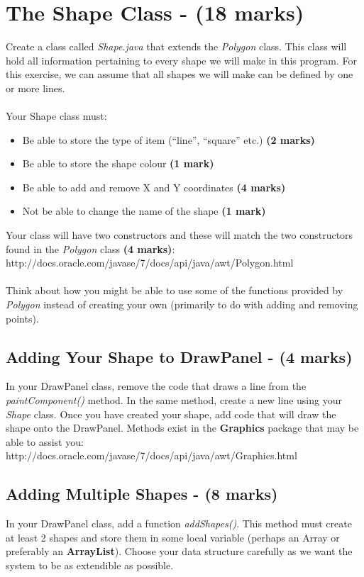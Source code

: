 \documentclass[a4paper,12pt]{article}
\begin{document}
\section{The Shape Class - (18 marks)}
Create a class called \textit{Shape.java} that extends the \textit{Polygon} class. This class will hold all information pertaining to every shape we will make in this program. For this exercise, we can assume that all shapes we will make can be defined by one or more lines.\\
\\
Your Shape class must:
\begin{itemize}
\item Be able to store the type of item (``line'', ``square'' etc.) {\bf (2 marks)}
\item Be able to store the shape colour {\bf (1 mark)}
\item Be able to add and remove X and Y coordinates {\bf (4 marks)}
\item Not be able to change the name of the shape {\bf (1 mark)}
\end{itemize}
Your class will have two constructors and these will match the two constructors found in the \textit{Polygon} class {\bf (4 marks)}:\\

http://docs.oracle.com/javase/7/docs/api/java/awt/Polygon.html\\
\\
Think about how you might be able to use some of the functions provided by \textit{Polygon} instead of creating your own (primarily to do with adding and removing points).

\subsection{Adding Your Shape to DrawPanel - (4 marks)}
In your DrawPanel class, remove the code that draws a line from the \textit{paintComponent()} method. In the same method, create a new line using your \textit{Shape} class. Once you have created your shape, add code that will draw the shape onto the DrawPanel. Methods exist in the {\bf Graphics} package that may be able to assist you:\\

http://docs.oracle.com/javase/7/docs/api/java/awt/Graphics.html

\subsection{Adding Multiple Shapes - (8 marks)}
In your DrawPanel class, add a function \textit{addShapes()}. This method must create at least 2 shapes and store them in some local variable (perhaps an Array or preferably an {\bf ArrayList}). Choose your data structure carefully as we want the system to be as extendible as possible.\\
\end{document}
